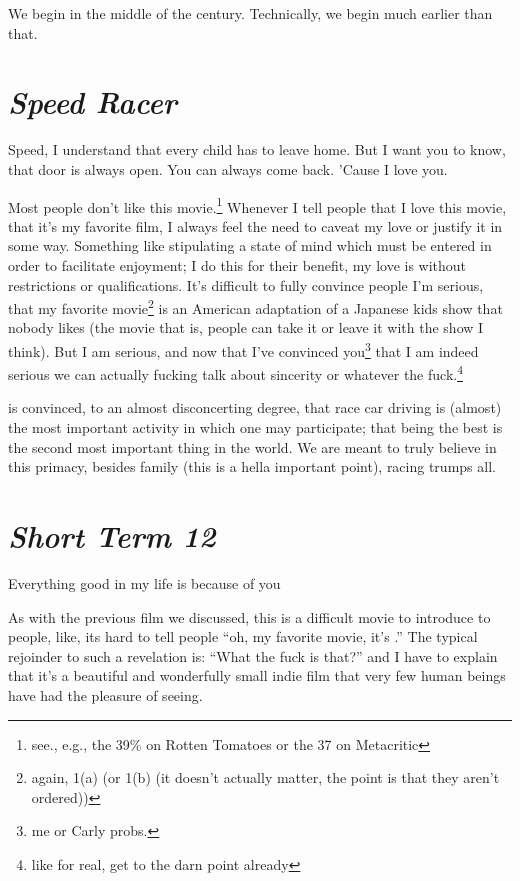 \documentclass[../butidigress.tex]{subfiles}
\begin{document}
We begin in the middle of the  century.
Technically, we begin much earlier than that.

\section{\textit{Speed Racer}}
\epigraph{Speed, I understand that every child has to leave home. But I want you to know, that door is always open. You can always come back. 'Cause I love you.}{}

Most people don't like this movie.\footnote{see., e.g., the 39\% on Rotten Tomatoes or the 37 on Metacritic}
Whenever I tell people that I love this movie, that it's my favorite film, I always feel the need to caveat my love or justify it in some way.
Something like stipulating a state of mind which must be entered in order to facilitate enjoyment; I do this for their benefit, my love is without restrictions or qualifications.
It's difficult to fully convince people I'm serious, that my favorite movie\footnote{again, 1(a) (or 1(b) (it doesn't actually matter, the point is that they aren't ordered))} is an American adaptation of a Japanese kids show that nobody likes (the movie that is, people can take it or leave it with the show I think).
But I am serious, and now that I've convinced you\footnote{me or Carly probs.} that I am indeed serious we can actually fucking talk about sincerity or whatever the fuck.\footnote{like for real, get to the darn point already}

 is convinced, to an almost disconcerting degree, that race car driving is (almost) the most important activity in which one may participate; that being the best is the second most important thing in the world.
We are meant to truly believe in this primacy, besides family (this is a hella important point), racing trumps all.

\section{\textit{Short Term 12}}
\epigraph{Everything good in my life is because of you}{}

As with the previous film we discussed, this is a difficult movie to introduce to people, like, its hard to tell people ``oh, my favorite movie, it's .''
The typical rejoinder to such a revelation is: ``What the fuck is that?'' and I have to explain that it's a beautiful and wonderfully small indie film that very few human beings have had the pleasure of seeing.
\end{document}
